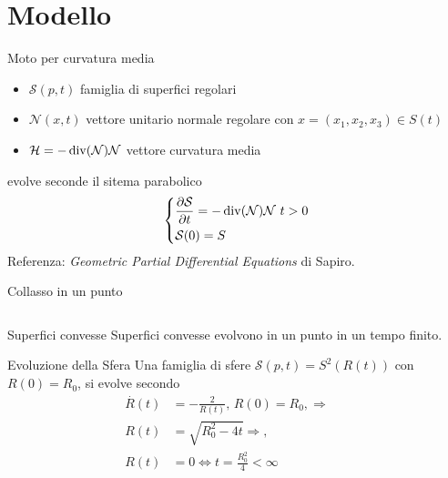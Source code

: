 \section{Modello}
\begin{frame}{Moto per curvatura media}
       \begin{itemize}
       \item $\mathcal{S}(p,t)$ famiglia di superfici regolari
       \item $\mathcal{N}(x,t)$ vettore unitario normale regolare con
         $x=(x_1,x_2,x_3)\in S(t)$
       \item $\mathcal{H}=-\operatorname{div}(\mathcal{N})\mathcal{N}$ vettore curvatura media
       \end{itemize}
       evolve seconde il sitema parabolico
       \[
       \left\{
       \begin{aligned}
         &\frac{\partial\mathcal{S}}{\partial t}=-\operatorname{div}(\mathcal{N})\mathcal{N}\text{ $t>0$} \\
         &\mathcal{S}(0)=S
       \end{aligned}
       \right.
       \]
Referenza: \emph{Geometric Partial Differential Equations} di Sapiro.
\end{frame}

\begin{frame}{Collasso in un punto}
  \begin{columns}[c]
    \begin{column}{6cm}
      \begin{block}{Superfici convesse}
       Superfici convesse  evolvono in un
       punto in un tempo finito.
       \end{block}
      \begin{exampleblock}{Evoluzione della Sfera}
        Una famiglia di sfere $\mathcal{S}(p,t)=S^2(R(t))$ con
        $R(0)=R_0$, si evolve secondo
        \[
        \begin{aligned}
          \overset{\displaystyle.}{R}(t) &= -\frac{2}{R(t)},\,
          R(0)=R_0,\Rightarrow\\
          R(t)&=\sqrt{R_0^2-4t}\Rightarrow, \\
          R(t)&=0 \Longleftrightarrow t=\frac{R_0^2}{4}<\infty 
        \end{aligned}
        \]
      \end{exampleblock}
    \end{column}
    \begin{column}[c]{4cm}
       \begin{center}
     \end{center}
    \end{column}
    \end{columns}
\end{frame}

